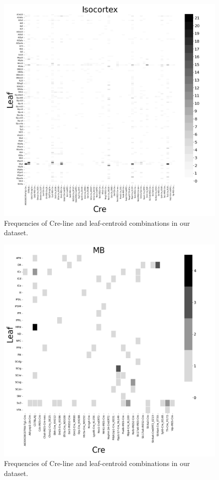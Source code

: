 \begin{figure}[H]
    \centering
    \includegraphics[width = 7in]{figs/Isocortex centroid density.png}
    \caption{Frequencies of Cre-line and leaf-centroid combinations in our dataset.}
    \label{fig:iso_count}
\end{figure}
\newpage

\begin{figure}[H]
    \centering
    \includegraphics[width = 7in]{figs/MB centroid density.png} 
    \caption{Frequencies of Cre-line and leaf-centroid combinations in our dataset.}
    \label{fig:my_label}
\end{figure}
\newpage

